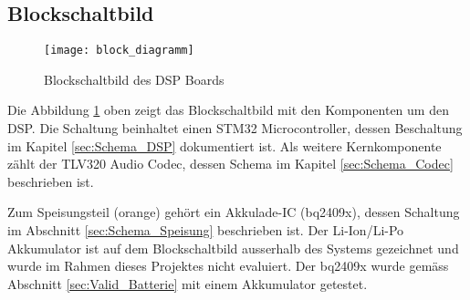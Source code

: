 \subsection{Blockschaltbild}
\label{sec:Blockschaltbild}

\begin{figure}[H]
	\centering
	\texttt{[image: block\_diagramm]}
	\caption{Blockschaltbild des DSP Boards}
	\label{pic:Blockdiagramm}
\end{figure}

Die Abbildung \ref{pic:Blockdiagramm} oben zeigt das Blockschaltbild mit den Komponenten um den DSP. Die Schaltung beinhaltet einen STM32 Microcontroller, dessen Beschaltung im Kapitel \ref{sec:Schema_DSP} dokumentiert ist. 
Als weitere Kernkomponente zählt der TLV320 Audio Codec, dessen Schema im Kapitel \ref{sec:Schema_Codec} beschrieben ist.

Zum Speisungsteil (orange) gehört ein Akkulade-IC (bq2409x), dessen Schaltung im Abschnitt \ref{sec:Schema_Speisung} beschrieben ist. Der Li-Ion/Li-Po Akkumulator ist auf dem Blockschaltbild ausserhalb des Systems gezeichnet und wurde im Rahmen dieses Projektes nicht evaluiert. Der bq2409x wurde gemäss Abschnitt \ref{sec:Valid_Batterie} mit einem Akkumulator getestet.





